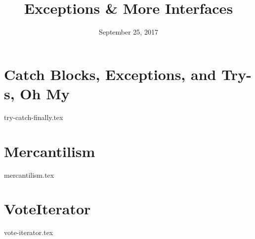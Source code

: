 \documentclass[11pt]{exam}
\title{Exceptions \& More Interfaces}
\date{September 25, 2017}
\begin{document}
\maketitle

\section{Catch Blocks, Exceptions, and Try-s, Oh My}
\begin{questions}
{try-catch-finally.tex}
\end{questions}

\clearpage

\section{Mercantilism}
\begin{questions}
{mercantilism.tex}
\end{questions}

\clearpage

\section{VoteIterator}
\begin{questions}
{vote-iterator.tex}
\end{questions}
\end{document}
